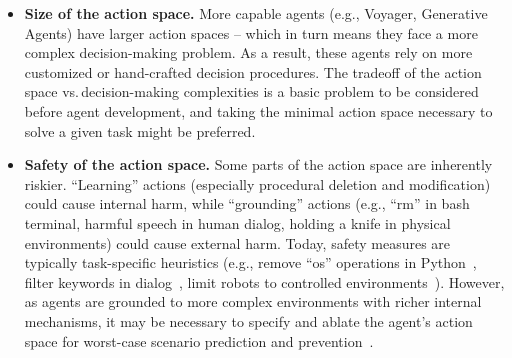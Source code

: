 \documentclass[10pt]{article} %
\begin{document}
\begin{itemize}
    \item \textbf{Size of the action space.} More capable agents (e.g., Voyager, Generative Agents) have larger action spaces -- which in turn means they face a more complex decision-making problem. 
    As a result, these agents rely on more customized or hand-crafted decision procedures.  
    The tradeoff of the action space vs.\,decision-making complexities is a basic problem to be considered before agent development, and taking the minimal action space necessary to solve a given task might be preferred.
    \item \textbf{Safety of the action space.} Some parts of the action space are inherently riskier.  ``Learning'' actions (especially procedural deletion and modification) could cause internal harm, while ``grounding'' actions (e.g., ``rm'' in bash terminal, harmful speech in human dialog, holding a knife in physical environments) could cause external harm. Today, safety measures are typically task-specific heuristics (e.g., remove ``os'' operations in Python~\citep{chen2021evaluating}, filter keywords in dialog~\citep{chowdhery2022palm, driess2023palm}, limit robots to controlled environments~\citep{ahn2022can}). However, as agents are grounded to more complex environments with richer internal mechanisms, it may be necessary to specify and ablate the agent's action space for worst-case scenario prediction and prevention~\citep{yao2023impact}. 
\end{itemize}
\end{document}
